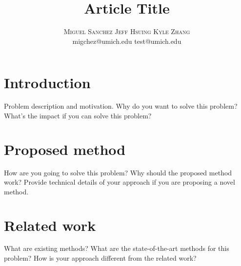 \documentclass[twoside]{article}
\title{\vspace{-15mm}\fontsize{24pt}{10pt}\selectfont\textbf{Article Title}} %
\author{
\large
\textsc{Miguel Sanchez Jeff Hsuing Kyle Zhang}\\
\normalsize migchez@umich.edu test@umich.edu %
\vspace{-5mm}
}
\date{}
\begin{document}
\maketitle %


\begin{abstract}

\noindent \lipsum[1] %

\end{abstract}


\section{Introduction}

Problem description and motivation. Why do you want to solve this problem? What's the impact if you can solve this problem?\\
\lipsum[2-3] %


\section{Proposed method}

How are you going to solve this problem? Why should the proposed method work? Provide technical details of your approach if you are proposing a novel method.\\
\lipsum[4] %


\section{Related work}

What are existing methods? What are the state-of-the-art methods for this problem? How is your approach different from the related work?\\

\lipsum[5] %
\end{document}
